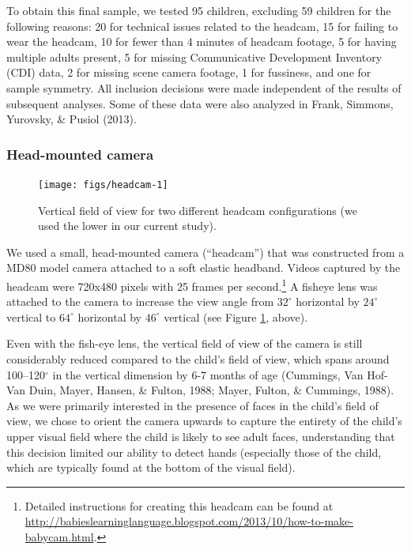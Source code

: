 \documentclass[10pt, letterpaper]{article}
\newenvironment{CodeChunk}{}{}
\begin{document}
To obtain this final sample, we tested 95 children, excluding 59
children for the following reasons: 20 for technical issues related to
the headcam, 15 for failing to wear the headcam, 10 for fewer than 4
minutes of headcam footage, 5 for having multiple adults present, 5 for
missing Communicative Development Inventory (CDI) data, 2 for missing
scene camera footage, 1 for fussiness, and one for sample symmetry. All
inclusion decisions were made independent of the results of subsequent
analyses. Some of these data were also analyzed in Frank, Simmons,
Yurovsky, \& Pusiol (2013).

\subsubsection{Head-mounted camera}\label{head-mounted-camera}

\begin{CodeChunk}
\begin{figure}[H]

{\centering \texttt{[image: figs/headcam-1]} 

}

\caption[Vertical field of view for two different headcam configurations (we used the lower in our current study)]{Vertical field of view for two different headcam configurations (we used the lower in our current study).}\label{fig:headcam}
\end{figure}
\end{CodeChunk}

We used a small, head-mounted camera (``headcam'') that was constructed
from a MD80 model camera attached to a soft elastic headband. Videos
captured by the headcam were 720x480 pixels with 25 frames per
second.\footnote{Detailed instructions for creating this headcam can be
  found at
  \url{http://babieslearninglanguage.blogspot.com/2013/10/how-to-make-babycam.html}.}
A fisheye lens was attached to the camera to increase the view angle
from \(32^{\circ}\) horizontal by \(24^{\circ}\) vertical to
\(64^{\circ}\) horizontal by \(46^{\circ}\) vertical (see Figure
\ref{fig:headcam}, above).

Even with the fish-eye lens, the vertical field of view of the camera is
still considerably reduced compared to the child's field of view, which
spans around 100--120\(^{\circ}\) in the vertical dimension by 6-7
months of age (Cummings, Van Hof-Van Duin, Mayer, Hansen, \& Fulton,
1988; Mayer, Fulton, \& Cummings, 1988). As we were primarily interested
in the presence of faces in the child's field of view, we chose to
orient the camera upwards to capture the entirety of the child's upper
visual field where the child is likely to see adult faces, understanding
that this decision limited our ability to detect hands (especially those
of the child, which are typically found at the bottom of the visual
field).
\end{document}
